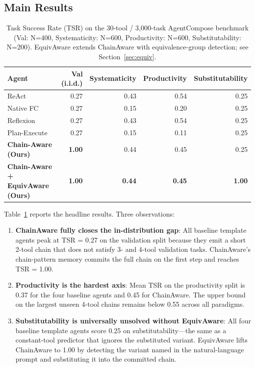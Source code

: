 \documentclass[10pt]{article}
\begin{document}
\subsection{Main Results}

\begin{table}[t]
    \centering
    \small
    \begin{tabular}{lrrrr}
        \toprule
        Agent & Val (i.i.d.) & Systematicity & Productivity & Substitutability \\
        \midrule
        ReAct & 0.27 & 0.43 & 0.54 & 0.25 \\
        Native FC & 0.27 & 0.15 & 0.20 & 0.25 \\
        Reflexion & 0.27 & 0.43 & 0.54 & 0.25 \\
        Plan-Execute & 0.27 & 0.15 & 0.11 & 0.25 \\
        \textbf{Chain-Aware (Ours)} & \textbf{1.00} & 0.44 & 0.45 & 0.25 \\
        \textbf{Chain-Aware + EquivAware (Ours)} & \textbf{1.00} & \textbf{0.44} & \textbf{0.45} & \textbf{1.00} \\
        \bottomrule
    \end{tabular}
    \caption{Task Success Rate (TSR) on the 30-tool / 3{,}000-task AgentCompose benchmark (Val: N=400, Systematicity: N=600, Productivity: N=600, Substitutability: N=200). EquivAware extends ChainAware with equivalence-group detection; see Section~\ref{sec:equiv}.}
    \label{tab:main}
\end{table}

Table~\ref{tab:main} reports the headline results. Three observations:

\begin{enumerate}
    \item \textbf{ChainAware fully closes the in-distribution gap}: All baseline template agents peak at TSR = 0.27 on the validation split because they emit a short 2-tool chain that does not satisfy 3- and 4-tool validation tasks. ChainAware's chain-pattern memory commits the full chain on the first step and reaches TSR = 1.00.
    \item \textbf{Productivity is the hardest axis}: Mean TSR on the productivity split is 0.37 for the four baseline agents and 0.45 for ChainAware. The upper bound on the largest unseen 4-tool chains remains below 0.55 across all paradigms.
    \item \textbf{Substitutability is universally unsolved without EquivAware}: All four baseline template agents score 0.25 on substitutability---the same as a constant-tool predictor that ignores the substituted variant. EquivAware lifts ChainAware to 1.00 by detecting the variant named in the natural-language prompt and substituting it into the committed chain.
\end{enumerate}
\end{document}
